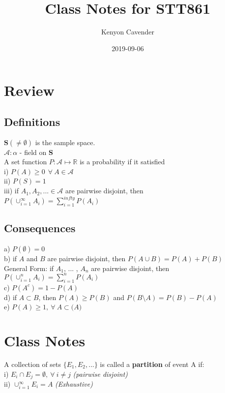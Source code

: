 \documentclass[12pt, oneside, letterpaper]{notes}
\begin{document}
\title{Class Notes for STT861}
\author{Kenyon Cavender}
\date{2019-09-06}
\maketitle

\section{Review}
\subsection*{Definitions}
$\textbf{S} ( \neq \emptyset )$ is the sample space. \\
$\mathscr{A} :  \alpha  $ - field on \textbf{S} \\
A set function $P: \mathscr{A} \mapsto \mathbb{R}$ is a probability if it satisfied \\
\indent i) $P(A) \geq 0 \: \: \forall \: A \in \mathscr{A}$ \\
\indent ii) $P(S) = 1 $\\
\indent iii) if $A_1 , A_2 , ... \in \mathscr{A}$ are pairwise disjoint, then \\
\indent \indent $ P(\cup_{i = 1}^{\infty} A_i ) = \sum_{i=1}^{infty} P( A_i )$

\subsection*{Consequences}
a) $P(\emptyset) = 0$ \\
b) if $A$ and $B$ are pairwise disjoint, then $P(A \cup B) = P(A) + P(B)$ \\
	\indent General Form: if $A_1$, ... , $A_n$ are pairwise disjoint, then \\
	\indent \indent $P(\cup_{i=1}^n A_i) = \sum_{i=1}^n P(A_i)$ \\
c) $P(A^c) = 1-P(A)$ \\
d) if $A \subset B$, then $P(A) \geq P(B)$ and $P(B \setminus A) = P(B) - P(A)$ \\
e) $P(A) \geq 1,  \: \forall \: A \subset \mathscr(A)$ \\

\section{Class Notes}
\begin{mydef}
	A collection of sets $\{E_1, E_2, ...\}$ is called a \textbf{partition} 
		of event A if: \\
	\indent i) $E_i \cap E_j = \emptyset, \: \forall \: i \neq j$ 
		\textit{(pairwise disjoint)} \\
  	\indent ii) $\cup_{i=1}^{\infty}E_i = A$ 
		\textit{(Exhaustive)}
\end{mydef}
\end{document}
